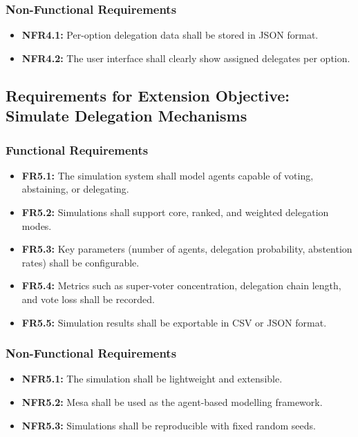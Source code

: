 \subsubsection{Non-Functional Requirements}
\begin{itemize}
    \item \textbf{NFR4.1:} Per-option delegation data shall be stored in JSON format.
    \item \textbf{NFR4.2:} The user interface shall clearly show assigned delegates per option.
\end{itemize}

\subsection{Requirements for Extension Objective: Simulate Delegation Mechanisms}
\subsubsection{Functional Requirements}
\begin{itemize}
    \item \textbf{FR5.1:} The simulation system shall model agents capable of voting, abstaining, or delegating.
    \item \textbf{FR5.2:} Simulations shall support core, ranked, and weighted delegation modes.
    \item \textbf{FR5.3:} Key parameters (number of agents, delegation probability, abstention rates) shall be configurable.
    \item \textbf{FR5.4:} Metrics such as super-voter concentration, delegation chain length, and vote loss shall be recorded.
    \item \textbf{FR5.5:} Simulation results shall be exportable in CSV or JSON format.
\end{itemize}

\subsubsection{Non-Functional Requirements}
\begin{itemize}
    \item \textbf{NFR5.1:} The simulation shall be lightweight and extensible.
    \item \textbf{NFR5.2:} Mesa shall be used as the agent-based modelling framework.
    \item \textbf{NFR5.3:} Simulations shall be reproducible with fixed random seeds.
\end{itemize}

